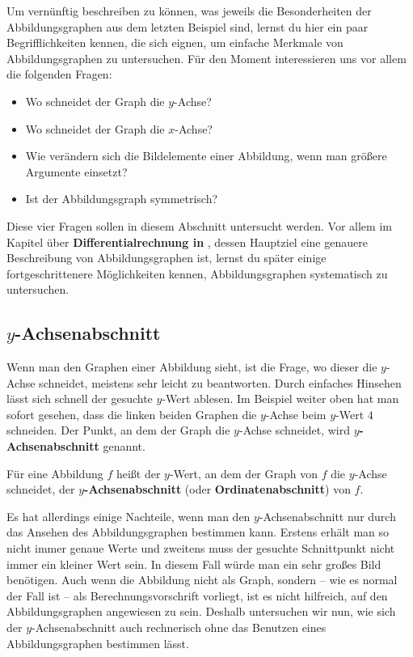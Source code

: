 \documentclass[../../main.tex]{subfiles}
\begin{document}
Um vernünftig beschreiben zu können, was jeweils die Besonderheiten der Abbildungsgraphen aus dem letzten Beispiel sind, lernst du hier ein paar Begrifflichkeiten kennen, die sich eignen, um einfache Merkmale von Abbildungsgraphen zu untersuchen. Für den Moment interessieren uns vor allem die folgenden Fragen:
\begin{itemize}[noitemsep]
    \item Wo schneidet der Graph die $y$-Achse?
    \item Wo schneidet der Graph die $x$-Achse?
    \item Wie verändern sich die Bildelemente einer Abbildung, wenn man größere Argumente einsetzt?
    \item Ist der Abbildungsgraph symmetrisch?
\end{itemize}

Diese vier Fragen sollen in diesem Abschnitt untersucht werden. Vor allem im Kapitel über \textbf{Differentialrechnung in \Real}, dessen Hauptziel eine genauere Beschreibung von Abbildungsgraphen ist, lernst du später einige fortgeschrittenere Möglichkeiten kennen, Abbildungsgraphen systematisch zu untersuchen.

\subsection{$y$-Achsenabschnitt}
\label{sec:abbildungen_ordinatenabschnitt}

Wenn man den Graphen einer Abbildung sieht, ist die Frage, wo dieser die $y$-Achse schneidet, meistens sehr leicht zu beantworten. Durch einfaches Hinsehen lässt sich schnell der gesuchte $y$-Wert ablesen. Im Beispiel weiter oben hat man sofort gesehen, dass die linken beiden Graphen die $y$-Achse beim $y$-Wert $4$ schneiden. Der Punkt, an dem der Graph die $y$-Achse schneidet, wird \textbf{$y$-Achsenabschnitt} genannt.

\begin{definition}[$y$-Achsenabschnitt]
    Für eine Abbildung $f$ heißt der $y$-Wert, an dem der Graph von $f$ die $y$-Achse schneidet, der \textbf{$y$-Achsenabschnitt} (oder \textbf{Ordinatenabschnitt}) von $f$.
\end{definition}

Es hat allerdings einige Nachteile, wenn man den $y$-Achsenabschnitt nur durch das Ansehen des Abbildungsgraphen bestimmen kann. Erstens erhält man so nicht immer genaue Werte und zweitens muss der gesuchte Schnittpunkt nicht immer ein kleiner Wert sein. In diesem Fall würde man ein sehr großes Bild benötigen. Auch wenn die Abbildung nicht als Graph, sondern -- wie es normal der Fall ist -- als Berechnungsvorschrift vorliegt, ist es nicht hilfreich, auf den Abbildungsgraphen angewiesen zu sein. Deshalb untersuchen wir nun, wie sich der $y$-Achsenabschnitt auch rechnerisch ohne das Benutzen eines Abbildungsgraphen bestimmen lässt.
\end{document}
